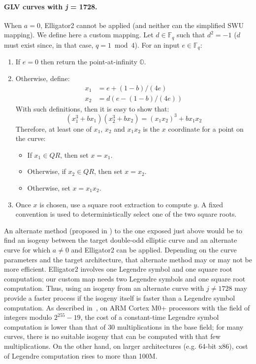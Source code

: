 \documentclass{llncs}
\newcommand{\QR}{QR}
\newcommand{\bF}{\mathbb{F}}
\newcommand{\neutral}{\mathbb{O}}
\begin{document}
\paragraph{GLV curves with \emph{j} = 1728.} When $a = 0$, Elligator2
cannot be applied (and neither can the simplified SWU mapping). We
define here a custom mapping. Let $d \in \bF_q$ such that $d^2 = -1$
($d$ must exist since, in that case, $q = 1\bmod 4$). For an input
$e \in \bF_q$:
\begin{enumerate}

    \item If $e = 0$ then return the point-at-infinity $\neutral$.

    \item Otherwise, define:
    \begin{align*}
        x_1 &= e + (1 - b)/(4e) \\
        x_2 &= d(e - (1 - b)/(4e))
    \end{align*}
    With such definitions, then it is easy to show that:
    \begin{equation*}
        (x_1^3 + bx_1)(x_2^3 + bx_2) = (x_1 x_2)^3 + b x_1 x_2
    \end{equation*}
    Therefore, at least one of $x_1$, $x_2$ and $x_1 x_2$ is the $x$
    coordinate for a point on the curve:
    \begin{itemize}
        \item If $x_1 \in \QR$, then set $x = x_1$.
        \item Otherwise, if $x_2 \in \QR$, then set $x = x_2$.
        \item Otherwise, set $x = x_1 x_2$.
    \end{itemize}

    \item Once $x$ is chosen, use a square root extraction to compute $y$.
    A fixed convention is used to deterministically select one of the
    two square roots.

\end{enumerate}

An alternate method (proposed in \cite{WahBon2019}) to the one exposed
just above would be to find an isogeny between the target double-odd
elliptic curve and an alternate curve for which $a \neq 0$ and
Elligator2 can be applied. Depending on the curve parameters and the
target architecture, that alternate method may or may not be more
efficient. Elligator2 involves one Legendre symbol and one square root
computation; our custom map needs two Legendre symbols and one square
root computation. Thus, using an isogeny from an alternate curve with $j
\neq 1728$ may provide a faster process if the isogeny itself is faster
than a Legendre symbol computation. As described in~\cite{Por2020-4}, on
ARM Cortex M0+ processors with the field of integers modulo
$2^{255}-19$, the cost of a constant-time Legendre symbol computation is
lower than that of 30 multiplications in the base field; for many
curves, there is no suitable isogeny that can be computed with that few
multiplications. On the other hand, on larger architectures (e.g. 64-bit
x86), cost of Legendre computation rises to more than 100M.
\end{document}
